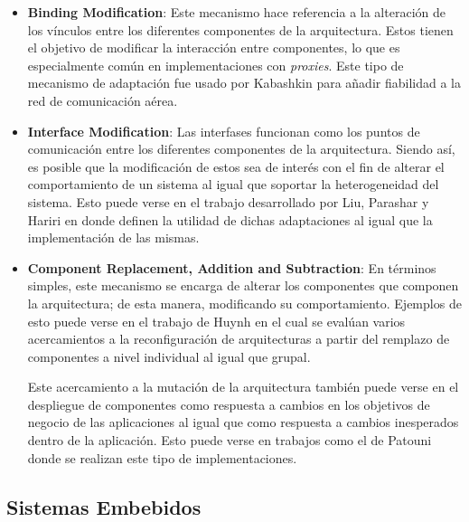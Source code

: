 \documentclass[12pt]{article}
\begin{document}
    \begin{itemize}
        \item \textbf{Binding Modification}: Este mecanismo hace referencia a la alteración de los vínculos entre los diferentes componentes de la arquitectura. Estos tienen el objetivo de modificar la interacción entre componentes, lo que es especialmente común en implementaciones con \textit{proxies}. Este tipo de mecanismo de adaptación fue usado por Kabashkin \citeyear{Kabashkin_2017} para añadir fiabilidad a la red de comunicación aérea.

        \item \textbf{Interface Modification}: Las interfases funcionan como los puntos de comunicación entre los diferentes componentes de la arquitectura. Siendo así, es posible que la modificación de estos sea de interés con el fin de alterar el comportamiento de un sistema al igual que soportar la heterogeneidad del sistema. Esto puede verse en el trabajo desarrollado por Liu, Parashar y Hariri \citeyear{Liu_2004} en donde definen la utilidad de dichas adaptaciones al igual que la implementación de las mismas.

        \item \textbf{Component Replacement, Addition and Subtraction}: En términos simples, este mecanismo se encarga de alterar los componentes que componen la arquitectura; de esta manera, modificando su comportamiento. Ejemplos de esto puede verse en el trabajo de Huynh \citeyear{Huynh_2019} en el cual se evalúan varios acercamientos a la reconfiguración de arquitecturas a partir del remplazo de componentes a nivel individual al igual que grupal. 
        
        Este acercamiento a la mutación de la arquitectura también puede verse en el despliegue de componentes como respuesta a cambios en los objetivos de negocio de las aplicaciones al igual que como respuesta a cambios inesperados dentro de la aplicación. Esto puede verse en trabajos como el de Patouni \citeyear{Patouni_2006} donde se realizan este tipo de implementaciones. 

    \end{itemize}

    \subsection{Sistemas Embebidos}
    
\end{document}
